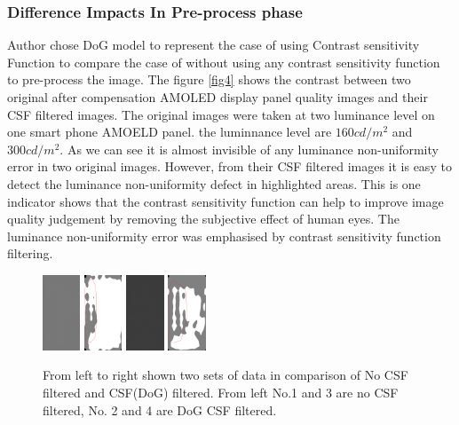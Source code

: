 \documentclass{article}
\begin{document}
\subsubsection{Difference Impacts In Pre-process phase}
Author chose DoG model to represent the case of using Contrast sensitivity Function to compare the case of without using any contrast sensitivity function to pre-process the image.  
The figure \ref{fig4} shows the contrast between two original after compensation AMOLED display panel quality images and their CSF filtered images. The original images were taken at two luminance level on one smart phone AMOELD panel. the luminnance level are $160 cd/m^2$ and $300 cd/m^2$. As we can see it is almost invisible of any luminance non-uniformity error in two original images. However, from their CSF filtered images it is easy to detect the luminance non-uniformity defect in highlighted areas. This is one indicator shows that the contrast sensitivity function can help to improve image quality judgement by removing the subjective effect of human eyes. The luminance non-uniformity error was emphasised by contrast sensitivity function filtering.

\begin{figure}[h]
    \centering
    \includegraphics[width=0.1\textwidth]{images/A1_G_160_I3_PsdLum.csv.png}\hfill    
    \includegraphics[width=0.1\textwidth]{images/DoG_csfed_A1_G_160_I3_PsdLum.csv.png}\hfill    
    \includegraphics[width=0.1\textwidth]{images/A1_G_300_I3_PsdLum.csv.png}\hfill
    \includegraphics[width=0.1\textwidth]{images/DoG_csfed_A1_G_300_I3_PsdLum.csv.png}
    \caption{ From left to right shown two sets of data in comparison of No CSF filtered and CSF(DoG) filtered. From left No.1 and 3 are no CSF filtered, No. 2 and 4 are DoG CSF filtered. }
    \label{fig3}
\end{figure}
\end{document}
